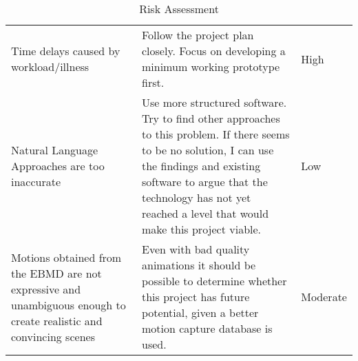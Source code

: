 \begin{table}[!ht]
	\centering
	\small
	
	\begin{tabular}{ |p{11em} |p{23.8em}|p{4em}| }
	 \hline
		\thead{Risk} & \thead{Mitigation} & \thead{Level} \\
	 \hline
	 	Time delays caused by workload/illness & Follow the project plan closely. Focus on developing a minimum working prototype first. & High \\
	 \hline
		Natural Language Approaches are too inaccurate & Use more structured software. Try to find other approaches to this problem. If there seems to be no solution, I can use the findings and existing software to argue that the technology has not yet reached a level that would make this project viable.  &  Low \\
	\hline
		Motions obtained from the EBMD are not expressive and unambiguous enough to create realistic and convincing scenes & Even with bad quality animations it should be possible to determine whether this project has future potential, given a better motion capture database is used. & Moderate \\
	\hline
	\end{tabular}

	 \caption{Risk Assessment}
	 \label{tab:riskassessment}
	 
\end{table}